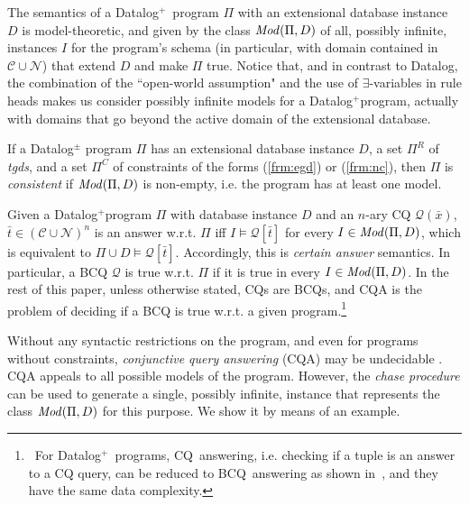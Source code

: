 \documentclass[format=acmsmall, review=false, screen=true]{acmart}
\newcommand{\bcq}{BCQ}
\newcommand{\cq}{CQ}
\newcommand{\mc}[1]{\mathcal{ #1}}
\newcommand{\nit}[1]{{\it #1}}
\newcommand{\dplus}{{Datalog}$^+$}
\newcommand{\tgds}{{\em tgds}}
\newcommand{\red}[1]{{#1}}
\newcommand{\blue}[1]{{#1}}
\newcommand{\commos}[1]{{\vspace{2mm}\noindent \bf \blue{COMM(MOSTAFA):}}~ #1 \hfill {\bf
    END.}\\}
\begin{document}
The semantics of a \dplus \ program $\Pi$ with \red{an extensional database instance $D$} is model-theoretic, and given by the class $\nit{Mod}(\Pi,\red{D})$ of all, \red{possibly infinite}, instances $\red{I}$ for the program's schema (in particular, with domain contained in $\mc{C} \cup \mc{N}$) that extend $D$ and make $\Pi$ true. \red{Notice that, and in contrast to Datalog,  the combination of the ``open-world assumption" and the use of $\exists$-variables in rule heads makes us consider possibly infinite models for a \dplus program, actually  with domains that go beyond the active domain of the extensional database.}

\blue{If a Datalog$^\pm$  program $\Pi$ has an extensional database instance $D$, a set $\Pi^R$ of \tgds, and a set $\Pi^C$ of constraints  of the forms (\ref{frm:egd}) or (\ref{frm:nc}), then $\Pi$ is {\em consistent} if
 $\nit{Mod}(\Pi,\red{D})$ is non-empty, i.e. the program has at least one model.}


\red{Given a \dplus program $\Pi$ with database instance $D$ and  an $n$-ary CQ $\mc{Q}(\bar{x})$, $\bar{t} \in (\mc{C} \cup \mc{N})^n$ is an answer \red{w.r.t. $\Pi$} iff $\red{I} \models \mc{Q}[\bar{t}]$ for every $\red{I} \in \nit{Mod}(\Pi,\red{D})$, which is equivalent to $\Pi \cup D \models \mc{Q}[\bar{t}]$.} Accordingly, this is {\em certain answer} semantics. \blue{In particular, a BCQ $\mc{Q}$ is true w.r.t. $\Pi$ if it is true in every  $\red{I} \in \nit{Mod}(\Pi,\red{D})$.} \blue{In the rest of this paper, unless otherwise stated, CQs are BCQs, and  CQA is the problem of deciding if a BCQ is true w.r.t. a given program.\footnote{\ \red{For \dplus \ programs, \cq \ answering, i.e. checking if a tuple is an answer to a CQ query,  can be reduced to \bcq \ answering as shown in~\cite{cali13}, and they have the same data complexity.}}}



Without any syntactic restrictions on the program, and even for programs without constraints, {\em conjunctive query answering} (CQA) may be undecidable \cite{beeri-icalp}.
CQA appeals to all possible models of the program. However, the {\em chase procedure} \cite{maier} can be used to generate a single, \red{possibly infinite}, instance that represents the class $\nit{Mod}(\Pi,\red{D})$ for this purpose. We show it by means of an example.
\end{document}
